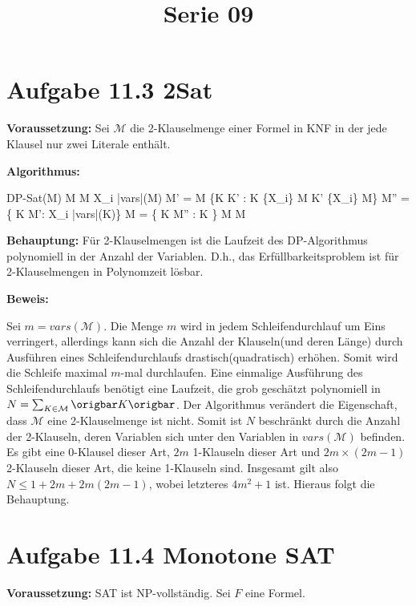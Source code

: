  
\usepackage{program}
\title{Serie 09}

 

  \section*{Aufgabe 11.3 2Sat}
  \textbf{Voraussetzung: } Sei $\mathcal{M}$ die 2-Klauselmenge einer Formel in KNF in der jede Klausel nur zwei Literale enthält.

  \noindent
  \textbf{Algorithmus:}
  \begin{program}
  \mbox{DP-Sat(M)}
  \WHILE M \neq \emptyset {} \emptyset \notin M%
  \END
  \BEGIN
     X_i \in |vars|(M) \neq \emptyset
    M' = M \cup \{K \cup K' : K \dot{\cup} \{X_i\} \in M  K' \dot{\cup} \{\neg X_i\} \in M\}
    M'' = \{ K \in M': X_i \notin |vars|(K)\}
    M = \{ K \in M'' : K  \}
  \END
  \IF \emptyset \in M \do
  \END
  \IF \emptyset \notin M \do
  \END
  \end{program}   

  
  \noindent
  \textbf{Behauptung: } Für 2-Klauselmengen ist die Laufzeit des DP-Algorithmus polynomiell in der Anzahl der Variablen. D.h., das Erfüllbarkeitsproblem ist für 2-Klauselmengen in Polynomzeit lösbar.
  
  \noindent
  \textbf{Beweis: }
  
  Sei $m = vars(\mathcal{M})$. Die Menge $m$ wird in jedem Schleifendurchlauf um Eins verringert, allerdings kann sich die Anzahl der Klauseln(und deren Länge) durch Ausführen eines Schleifendurchlaufs drastisch(quadratisch) erhöhen. Somit wird die Schleife maximal $m$-mal durchlaufen. Eine einmalige Ausführung des Schleifendurchlaufs benötigt eine Laufzeit, die grob geschätzt polynomiell in $N = \sum_{K \in \mathcal{M}} \origbar K \origbar$. Der Algorithmus verändert die Eigenschaft, dass $\mathcal{M}$ eine 2-Klauselmenge ist nicht. Somit ist $N$ beschränkt durch die Anzahl der 2-Klauseln, deren Variablen sich unter den Variablen in $vars(\mathcal{M})$ befinden. Es gibt eine 0-Klausel dieser Art, $2m$ 1-Klauseln dieser Art und $2m \times (2m - 1)$ 2-Klauseln dieser Art, die keine 1-Klauseln sind. Insgesamt gilt also $N \leq 1+ 2m + 2m(2m - 1)$, wobei letzteres $4m^2 + 1$ ist. Hieraus folgt die Behauptung.
 
  \section*{Aufgabe 11.4 Monotone SAT}
  \textbf{Voraussetzung: } SAT ist NP-vollständig. Sei $F$ eine Formel.
  
